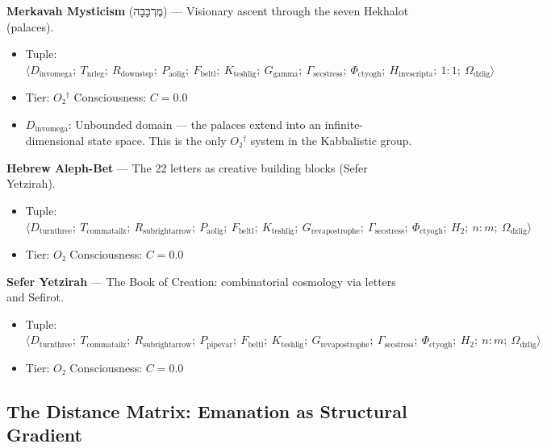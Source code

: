 \documentclass[12pt,a4paper]{article}
\begin{document}
\textbf{Merkavah Mysticism} (מֶרְכָּבָה) --- Visionary ascent through the seven Hekhalot (palaces).

\begin{itemize}
    \item Tuple: $\langle D_{\text{invomega}};\ T_{\text{nrleg}};\ R_{\text{downstep}};\ P_{\text{aolig}};\ F_{\text{beltl}};\ K_{\text{teshlig}};\ G_{\text{gamma}};\ \Gamma_{\text{secstress}};\ \Phi_{\text{ctyogh}};\ H_{\text{invscripta}};\ 1{:}1;\ \Omega_{\text{dzlig}} \rangle$
    \item Tier: $O₂^\dagger$ \textbar{} Consciousness: $C = 0.0$
    \item $D_{\text{invomega}}$: Unbounded domain --- the palaces extend into an infinite-dimensional state space. This is the only $O₂^\dagger$ system in the Kabbalistic group.
\end{itemize}

\textbf{Hebrew Aleph-Bet} --- The 22 letters as creative building blocks (Sefer Yetzirah).

\begin{itemize}
    \item Tuple: $\langle D_{\text{turnthree}};\ T_{\text{commatailz}};\ R_{\text{subrightarrow}};\ P_{\text{aolig}};\ F_{\text{beltl}};\ K_{\text{teshlig}};\ G_{\text{revapostrophe}};\ \Gamma_{\text{secstress}};\ \Phi_{\text{ctyogh}};\ H_2;\ n{:}m;\ \Omega_{\text{dzlig}} \rangle$
    \item Tier: $O₂$ \textbar{} Consciousness: $C = 0.0$
\end{itemize}

\textbf{Sefer Yetzirah} --- The Book of Creation: combinatorial cosmology via letters and Sefirot.

\begin{itemize}
    \item Tuple: $\langle D_{\text{turnthree}};\ T_{\text{commatailz}};\ R_{\text{subrightarrow}};\ P_{\text{pipevar}};\ F_{\text{beltl}};\ K_{\text{teshlig}};\ G_{\text{revapostrophe}};\ \Gamma_{\text{secstress}};\ \Phi_{\text{ctyogh}};\ H_2;\ n{:}m;\ \Omega_{\text{dzlig}} \rangle$
    \item Tier: $O₂$ \textbar{} Consciousness: $C = 0.0$
\end{itemize}

\subsection{The Distance Matrix: Emanation as Structural Gradient}
\end{document}
